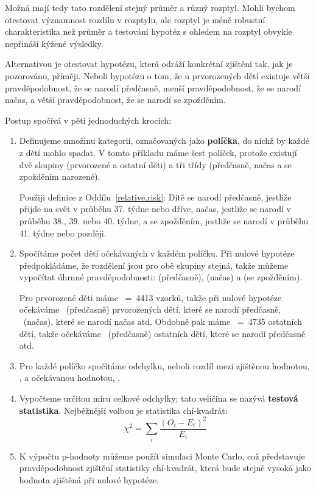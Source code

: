 \documentclass[12pt]{book}
\begin{document}
Možná mají tedy tato rozdělení stejný průměr a různý rozptyl. Mohli bychom otestovat významnost rozdílu v rozptylu, ale rozptyl je méně robustní charakteristika než průměr a testování hypotéz s ohledem na rozptyl obvykle nepřináší kýžené výsledky.

Alternativou je otestovat hypotézu, která odráží konkrétní zjištění tak, jak je pozorováno, příměji. Neboli hypotézu o tom, že u prvorozených dětí existuje větší pravděpodobnost, že se narodí předčasně, menší pravděpodobnost, že se narodí načas, a větší pravděpodobnost, že se narodí se zpožděním.

Postup spočívá v pěti jednoduchých krocích:

\begin{enumerate}

\item Definujeme množinu kategorií, označovaných jako {\bf políčka}, do nichž by každé z dětí mohlo spadat. V tomto příkladu máme šest políček, protože existují dvě skupiny (prvorozené a ostatní děti) a tři třídy (předčasně, načas a se zpožděním narozené).

Použiji definice z Oddílu~\ref{relative.risk}: Dítě se narodí předčasně, jestliže přijde na svět v průběhu 37. týdne nebo dříve, načas, jestliže se narodí v průběhu 38., 39. nebo 40. týdne, a se zpožděním, jestliže se narodí v průběhu 41. týdne nebo později.

\item Spočítáme počet dětí očekávaných v každém políčku. Při nulové hypotéze předpokládáme, že rozdělení jsou pro obě skupiny stejná, takže můžeme vypočítat úhrnné pravděpodobnosti:
  \Prob(předčasně), \Prob(načas) a \Prob(se zpožděním).

Pro prvorozené děti máme \n~=~4413 vzorků, takže při nulové hypotéze očekáváme \n~\Prob(předčasně) prvorozených dětí, které se narodí předčasně, \n~\Prob(načas), které se narodí načas atd.  Obdobně pak máme \m~=~4735
ostatních dětí, takže očekáváme \m~\Prob(předčasně) ostatních dětí, které se narodí předčasně atd.

\item Pro každé políčko spočítáme odchylku, neboli rozdíl mezi zjištěnou hodnotou, \OO{}, a očekávanou hodnotou, \E{}.

\item Vypočteme určitou míru celkové odchylky; tato veličina se nazývá {\bf testová statistika}.  Nejběžnější volbou je statistika chí-kvadrát:
%
\[ \chi^2 = \sum_i \frac{(O_i - E_i)^2}{E_i} \]
%

\item K výpočtu p-hodnoty můžeme použít simulaci Monte Carlo, což představuje pravděpodobnost zjištění statistiky chí-kvadrát, která bude stejně vysoká jako hodnota zjištěná při nulové hypotéze.

\end{enumerate}
\end{document}
